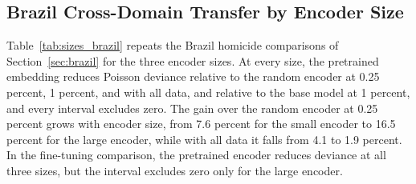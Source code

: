 \documentclass[11pt, letterpaper]{article}
\begin{document}
\subsection{Brazil Cross-Domain Transfer by Encoder Size}
\label{app:sizes_brazil}
Table~\ref{tab:sizes_brazil} repeats the Brazil homicide comparisons of Section~\ref{sec:brazil} for the three encoder sizes. At every size, the pretrained embedding reduces Poisson deviance relative to the random encoder at 0.25 percent, 1 percent, and with all data, and relative to the base model at 1 percent, and every interval excludes zero. The gain over the random encoder at 0.25 percent grows with encoder size, from 7.6 percent for the small encoder to 16.5 percent for the large encoder, while with all data it falls from 4.1 to 1.9 percent. In the fine-tuning comparison, the pretrained encoder reduces deviance at all three sizes, but the interval excludes zero only for the large encoder.
\end{document}
